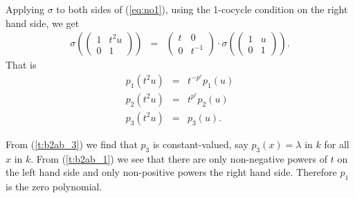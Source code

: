 Applying $\sigma$ to both sides of (\ref{eq:no1}), using the 1-cocycle condition on the right hand side, we get
\begin{eqnarray*}
\sigma\left(
	\left(\begin{matrix} 1 & t^2u \\ 0 & 1\end{matrix}\right)
\right) &=&
\left(\begin{matrix} t & 0 \\ 0 & t^{-1}  \end{matrix}\right) \cdot
\sigma\left(
	\left(\begin{matrix} 1 & u \\ 0 & 1 \end{matrix}\right) 
\right).
\end{eqnarray*}
That is
\begin{eqnarray}
\label{t:b2ab_1}
p_1(t^2u) &=& t^{-p^r} p_1(u) \\
\label{t:b2ab_2}
p_2(t^2u) &=& t^{p^r}p_2(u) \\
\label{t:b2ab_3}
p_3(t^2u) &=&  p_3(u).
\end{eqnarray}

From (\ref{t:b2ab_3}) we find that $p_3$ is constant-valued, say $p_3(x)=\lambda$ in $k$ for all $x$ in $k$. From (\ref{t:b2ab_1}) we see that there are only non-negative powers of $t$ on the left hand side and only non-positive powers the right hand side. Therefore $p_1$ is the zero polynomial.

